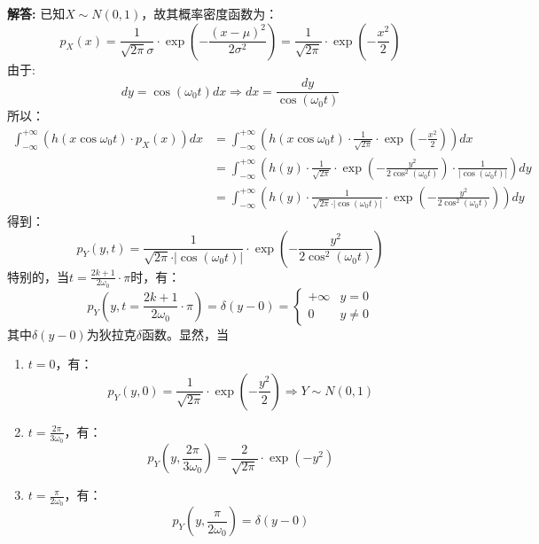 \documentclass[12pt, onecolumn]{article}
\newcommand\normf{\fangsong}
\newenvironment{solution}{\par\noindent\normf\textbf{解答: }}{\leavevmode\\\par}
\begin{document}
	\begin{solution}
		已知${X}\sim N(0,1)$，故其概率密度函数为：
		\begin{equation*}
		p_{X}(x)=\frac{1}{\sqrt{2\pi}\sigma}\cdot \exp{\left( -\frac{(x-\mu)^2}{2\sigma^2}\right) }
		=\frac{1}{\sqrt{2\pi}}\cdot \exp{\left( -\frac{x^2}{2}\right) }
		\end{equation*}
		由于:
		\begin{equation*}
		dy=\cos\left( \omega_0 t\right)dx \Rightarrow dx=\frac{dy}{\cos\left( \omega_0 t\right)}
		\end{equation*}
		所以：
		\begin{equation*}
		\begin{aligned}
				\int_{-\infty}^{+\infty}\left(
		h(x\cos\omega_0 t)\cdot p_{X}(x)
		\right) dx&=
		\int_{-\infty}^{+\infty}\left(
		h(x\cos\omega_0 t)\cdot \frac{1}{\sqrt{2\pi}}\cdot \exp{\left( -\frac{x^2}{2}\right) }
		\right) dx
		\\
		&=\int_{-\infty}^{+\infty}\left(
		h(y)\cdot \frac{1}{\sqrt{2\pi}}\cdot \exp{\left( -\frac{y^2}{2\cos^2\left( \omega_0 t\right)}\right) }
		 \cdot\frac{1}{\vert\cos\left( \omega_0 t\right)\vert} \right)dy
		 \\
		 &=\int_{-\infty}^{+\infty}\left(
		 h(y)\cdot \frac{1}{\sqrt{2\pi}\cdot\vert\cos\left( \omega_0 t\right)\vert}\cdot \exp{\left( -\frac{y^2}{2\cos^2\left( \omega_0 t\right)}\right) }
		 \right)dy
		\end{aligned}
		\end{equation*}
		得到：
		\begin{equation*}
		p_{Y}(y,t)=\frac{1}{\sqrt{2\pi}\cdot\vert\cos\left( \omega_0 t\right)\vert}\cdot \exp{\left( -\frac{y^2}{2\cos^2\left( \omega_0 t\right)}\right) }
		\end{equation*}
		特别的，当$t=\frac{2k+1}{2\omega_0}\cdot\pi$时，有：
		\begin{equation*}
		p_{Y}(y,t=\frac{2k+1}{2\omega_0}\cdot\pi)=\delta(y-0)=\begin{cases}
		+\infty&y=0\\
		0&y\ne 0
		\end{cases}
		\end{equation*}
		其中$\delta(y-0)$为狄拉克$\delta$函数。显然，当
		\begin{enumerate}
			\item $t=0$，有：
			\begin{equation*}
			p_{Y}(y,0)=\frac{1}{\sqrt{2\pi}}\cdot \exp{\left( -\frac{y^2}{2}\right) }
			\Rightarrow{Y}\sim N(0,1)
			\end{equation*}
			\item $t=\frac{2\pi}{3\omega_0}$，有：
			\begin{equation*}
			p_{Y}(y,\frac{2\pi}{3\omega_0})=\frac{2}{\sqrt{2\pi}}\cdot \exp{\left( -y^2\right) }
			\end{equation*}
			\item $t=\frac{\pi}{2\omega_0}$，有：
			\begin{equation*}
			p_{Y}(y,\frac{\pi}{2\omega_0})=\delta(y-0)
			\end{equation*}
		\end{enumerate}	
	\end{solution}
\end{document}
